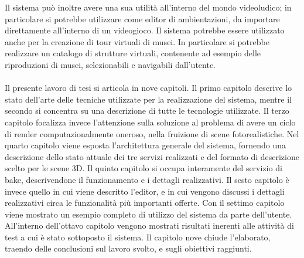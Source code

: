 Il sistema può inoltre avere una sua utilità all'interno del mondo videoludico; in particolare si potrebbe utilizzare come editor di ambientazioni, da importare direttamente all'interno di un videogioco.
Il sistema potrebbe essere utilizzato anche per la creazione di tour virtuali di musei. In particolare si potrebbe realizzare un catalogo di strutture virtuali, contenente ad esempio delle riproduzioni di musei, selezionabili e navigabili dall'utente.
\\
\\
Il presente lavoro di tesi si articola in nove capitoli.
Il primo capitolo descrive lo stato dell’arte delle tecniche utilizzate per la realizzazione del sistema, mentre il secondo si concentra su una descrizione di tutte le tecnologie utilizzate.
Il terzo capitolo focalizza invece l’attenzione sulla soluzione al problema di avere un ciclo di render computazionalmente oneroso, nella fruizione di scene fotorealistiche. 
Nel quarto capitolo viene esposta l’architettura generale del sistema, fornendo una descrizione dello stato attuale dei tre servizi realizzati e del formato di descrizione scelto per le scene 3D. 
Il quinto capitolo si occupa interamente del servizio di bake, descrivendone il funzionamento e i dettagli realizzativi. Il sesto capitolo è invece quello in cui viene descritto l’editor, e in cui vengono discussi i dettagli realizzativi circa le funzionalità più importanti offerte.
Con il settimo capitolo viene mostrato un esempio completo di utilizzo del sistema da parte dell’utente.
All'interno dell'ottavo capitolo vengono mostrati risultati inerenti alle attività di test a cui è stato sottoposto il sistema.
Il capitolo nove chiude l'elaborato, traendo delle conclusioni sul lavoro svolto, e sugli obiettivi raggiunti.